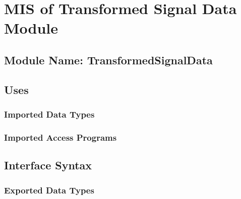 \documentclass[12pt]{article}
\begin{document}
\section{MIS of Transformed Signal Data Module}
\subsection{Module Name: TransformedSignalData}
\subsection{Uses}
\subsubsection{Imported Data Types}

\subsubsection{Imported Access Programs}

\subsection{Interface Syntax}

\subsubsection{Exported Data Types}
\end{document}
